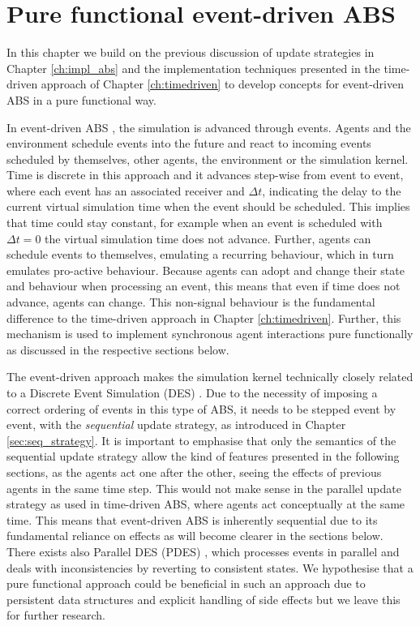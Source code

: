 \chapter{Pure functional event-driven ABS}
\label{ch:eventdriven}
In this chapter we build on the previous discussion of update strategies in Chapter \ref{ch:impl_abs} and the implementation techniques presented in the time-driven approach of Chapter \ref{ch:timedriven} to develop concepts for event-driven ABS in a pure functional way. 

\medskip

In event-driven ABS \cite{meyer_event-driven_2014}, the simulation is advanced through events. Agents and the environment schedule events into the future and react to incoming events scheduled by themselves, other agents, the environment or the simulation kernel. Time is discrete in this approach and it advances step-wise from event to event, where each event has an associated receiver and $\Delta t$, indicating the delay to the current virtual simulation time when the event should be scheduled. This implies that time could stay constant, for example when an event is scheduled with $\Delta t = 0$ the virtual simulation time does not advance. Further, agents can schedule events to themselves, emulating a recurring behaviour, which in turn emulates pro-active behaviour. Because agents can adopt and change their state and behaviour when processing an event, this means that even if time does not advance, agents can change. This non-signal behaviour is the fundamental difference to the time-driven approach in Chapter \ref{ch:timedriven}. Further, this mechanism is used to implement synchronous agent interactions pure functionally as discussed in the respective sections below.

The event-driven approach makes the simulation kernel technically closely related to a Discrete Event Simulation (DES) \cite{zeigler_theory_2000}. Due to the necessity of imposing a correct ordering of events in this type of ABS, it needs to be stepped event by event, with the \textit{sequential} update strategy, as introduced in Chapter \ref{sec:seq_strategy}. It is important to emphasise that only the semantics of the sequential update strategy allow the kind of features  presented in the following sections, as the agents act one after the other, seeing the effects of previous agents in the same time step. This would not make sense in the parallel update strategy as used in time-driven ABS, where agents act conceptually at the same time. This means that event-driven ABS is inherently sequential due to its fundamental reliance on effects as will become clearer in the sections below. There exists also Parallel DES (PDES) \cite{fujimoto_parallel_1990}, which processes events in parallel and deals with inconsistencies by reverting to consistent states. We hypothesise that a pure functional approach could be beneficial in such an approach due to persistent data structures and explicit handling of side effects but we leave this for further research.

